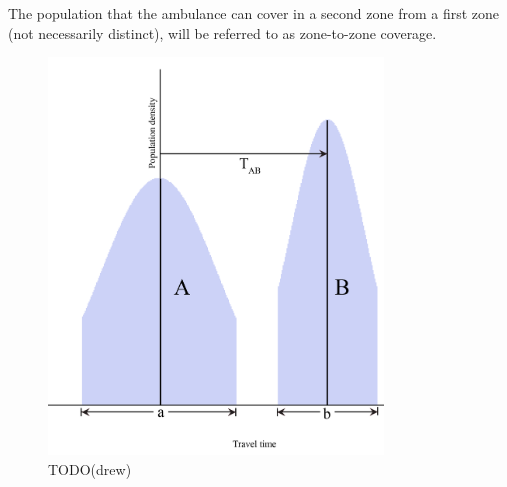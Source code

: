 \documentclass[notitlepage, 12pt]{article}
\begin{document}
The population that the ambulance can cover in a second zone from a first zone (not necessarily distinct), will be referred to as zone-to-zone coverage.
\newpage

\begin{figure}[htbp]
\begin{center}
\includegraphics[width=3.5in]{A(t)B(t).png}
\caption{TODO(drew)}
\label{A(t)B(t)}
\end{center}
\end{figure}
\end{document}
